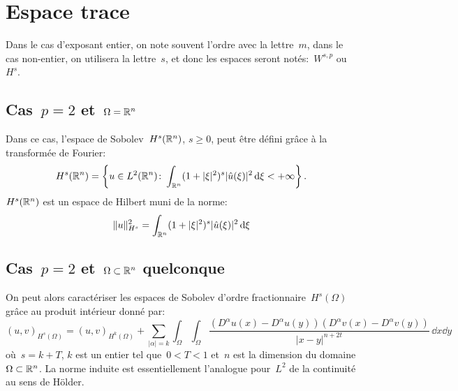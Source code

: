 \medskip
\section{Espace trace}


\medskip
Dans le cas d'exposant entier, on note souvent l'ordre avec la lettre~$m$,
dans le cas non-entier, on utilisera la lettre~$s$, et donc les espaces seront notés:~$W^{s,p}$ ou~$H^s$.

\medskip
\subsection{Cas~$p=2$ et~$\Omega=\mathbb R^{n}$}

Dans ce cas, l'espace de Sobolev~$H^{s}(\mathbb R^n)$, $s\geqslant 0$, peut être défini grâce
à la transformée de Fourier:
\begin{equation}
H^{s} (\mathbb R^n) = \left\{ u \in L^{2}(\mathbb R^n) \colon \int_{\mathbb R^n} ( 1 + | \xi |^{2} )^{s} | \hat{u} (\xi) |^{2} \, \text{d}\xi < + \infty \right\}.
\end{equation}
$H^{s}(\mathbb R^n)$ est un espace de Hilbert muni de la norme:
\begin{equation}\| u \|_{H^{s}}^{2} = \int_{\mathbb R^n} ( 1 + | \xi |^{2} )^{s} | \hat{u} (\xi) |^{2} \, \text{d}\xi \end{equation}

\medskip
\subsection{Cas~$p=2$ et~$\Omega \subset \mathbb R^{n}$ quelconque}
On peut alors caractériser les espaces de Sobolev d'ordre fractionnaire~$H^s(\Omega)$
grâce au produit intérieur donné par:
\begin{equation}
(u, v)_{H^{s} (\Omega)} = (u,v)_{H^{k} (\Omega)} + \sum_{| \alpha | = k} \int_{\Omega} \int_{\Omega} \frac{( D^{\alpha}u (x) - D^{\alpha}u (y) ) (D^{\alpha}v (x) - D^{\alpha}v (y) )}{| x - y |^{n + 2 t}} \, \dd x \dd y
\end{equation}
où~$s = k + T$, $k$ est un entier tel que~$0 < T < 1$ et~$n$ est la dimension du domaine
$\Omega \subset \mathbb R^{n}$.
La norme induite est essentiellement l'analogue pour~$L^2$ de la continuité au sens de H\"older.

